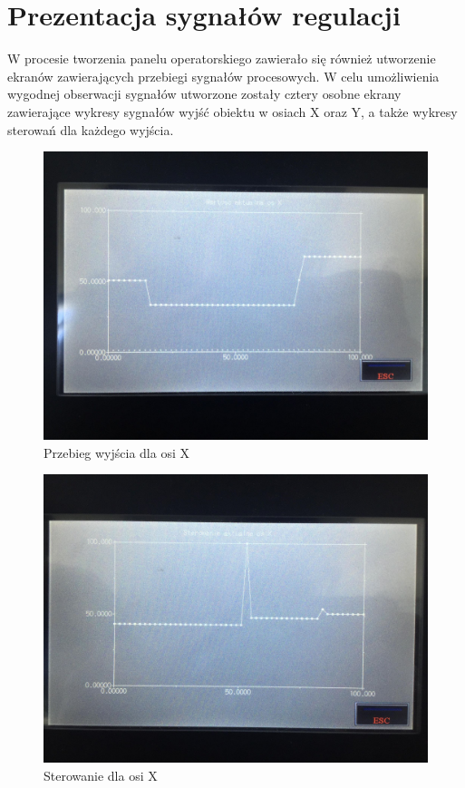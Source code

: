 \section{Prezentacja sygnałów regulacji}
\label{inteco_wizualizacja_wykresy}
W procesie tworzenia panelu operatorskiego zawierało się również utworzenie ekranów zawierających przebiegi sygnałów procesowych. W celu umożliwienia wygodnej obserwacji sygnałów utworzone zostały cztery osobne ekrany zawierające wykresy sygnałów wyjść obiektu w osiach X oraz Y, a także wykresy sterowań dla każdego wyjścia.
\vspace{1cm}
\begin{figure}[H]
    \label{Wykresy::output_x}
    \centering
    \includegraphics[scale=0.15]{./sections/inteco/images/output_x.jpg}
    \caption{Przebieg wyjścia dla osi X}
\end{figure}

\begin{figure}[H]
    \label{Wykres::input_x}
    \centering
    \includegraphics[scale=0.15]{./sections/inteco/images/input_x.jpg}
    \caption{Sterowanie dla osi X}
\end{figure}
\newpage

